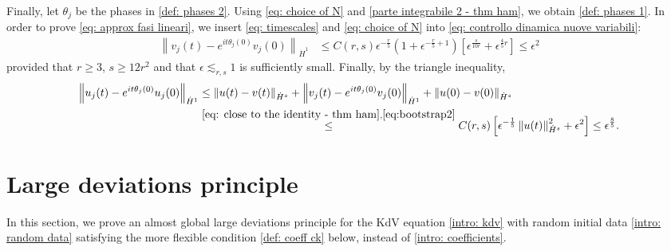 \documentclass[a4paper,10pt,reqno]{article}
\theoremstyle{definition}
\theoremstyle{plain}
\theoremstyle{plain}
\theoremstyle{definition}
\theoremstyle{plain}
\theoremstyle{plain}
\theoremstyle{plain}
\theoremstyle{definition}
\theoremstyle{definition}
\newcommand{\norm}[1]{\left\lVert #1 \right\rVert}
\def \Z{\mathbb Z}
\def \T{\mathbb{T}}
\begin{document}
Finally, let $\theta_j$ be the phases in \eqref{def: phases 2}. Using \eqref{eq: choice of N} and \eqref{parte integrabile 2 - thm ham}, we obtain \eqref{def: phases 1}.
In order to prove \eqref{eq: approx fasi lineari}, we insert \eqref{eq: timescales} and \eqref{eq: choice of N} into \eqref{eq: controllo dinamica nuove variabili}:
\begin{equation}\label{eq:bootstrap2}
\begin{split}
\norm{v_j(t)-e^{i t \theta_j(0)}v_j(0)}_{\dot{H}^1} & \le C(r,s) \epsilon^{-\frac{r}{5}} \left ( 1 + \epsilon^{-\frac{r}{5}+1} \right ) \left [ \epsilon^{\frac{s}{10r}} + \epsilon^{\frac45 r} \right] \le \epsilon^2
\end{split}
\end{equation}
provided that $r \ge 3$, $s \ge 12r^2$ and that $\epsilon \lesssim_{r,s} 1$ is sufficiently small. 
Finally, by the triangle inequality,
\[
\begin{split}
\norm{u_j(t)-e^{i t \theta_j(0)}u_j(0)}_{\dot{H}^1} &\le \norm{u(t)-v(t)}_{\dot{H}^s} + \norm{v_j(t)-e^{i t \theta_j(0)}v_j(0)}_{\dot{H}^1} + \norm{u(0)-v(0)}_{\dot{H}^s} \\
& \stackrel{\eqref{eq: close to the identity - thm ham},\eqref{eq:bootstrap2}}{\le} C(r,s) \left [ \epsilon^{-\frac{1}{5}} \norm{u(t)}_{\dot{H}^s}^2 + \epsilon^{2} \right ] \le \epsilon^{\frac{8}{5}}.
\end{split}
\]


\section{Large deviations principle} \label{subsection: probability}

In this section, we prove an almost global large deviations principle for the KdV equation \eqref{intro: kdv} with random initial data \eqref{intro: random data} satisfying the more flexible condition \eqref{def: coeff ck} below, instead of \eqref{intro: coefficients}.

\end{document}
